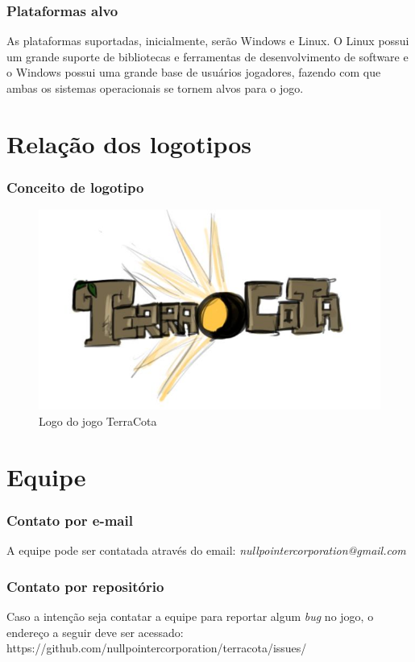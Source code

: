 \documentclass[11pt]{article}
\begin{document}
\section{Plataformas alvo}
As plataformas suportadas, inicialmente, serão Windows e Linux.
O Linux possui um grande suporte de bibliotecas e ferramentas de desenvolvimento de software e o Windows possui uma grande base de usuários jogadores, fazendo com que ambas os sistemas operacionais se tornem alvos para o jogo.

\newpage
\part{Relação dos logotipos}
\section{Conceito de logotipo}
\begin{figure}[htp]
\centering
\includegraphics[scale=0.75]{logo-terracota.jpg}
\caption{Logo do jogo TerraCota}
\label{TerraCota logo}
\end{figure}

\newpage
\part{Equipe}
\section{Contato por e-mail}
A equipe pode ser contatada através do email: \textit{nullpointercorporation@gmail.com}

\section{Contato por repositório}
Caso a intenção seja contatar a equipe para reportar algum \textit{bug} no jogo, o endereço a seguir deve ser acessado: https://github.com/nullpointercorporation/terracota/issues/
\newpage
\end{document}
